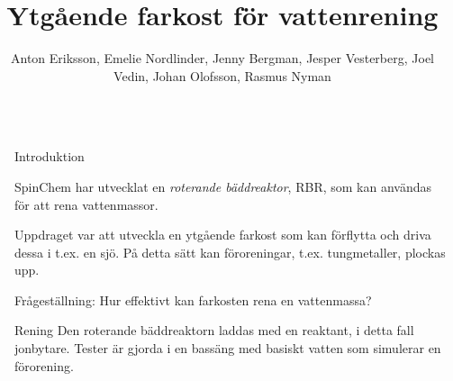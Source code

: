 \documentclass[final]{beamer}
\title{Ytgående farkost för vattenrening}
\author{Anton Eriksson, Emelie Nordlinder, Jenny Bergman,
  Jesper Vesterberg, Joel Vedin, Johan Olofsson, Rasmus Nyman}
\institute{Design-Build-Test Grupp 5, Umeå Universitet}
\newlength{\onecolwid}
\begin{document}

\setlength{\belowcaptionskip}{2ex} %
\setlength\belowdisplayshortskip{2ex} %

\begin{frame}[t]

  \begin{columns}[c]
    \begin{column}{\textwidth}
      \centering
      \vskip 1cm
      \vskip 2cm
    \end{column}
  \end{columns}

  \vspace{2cm}

  \begin{columns}[t, totalwidth=\textwidth]

    \begin{column}{0.001\textwidth}\end{column} %

    \begin{column}{\onecolwid}

      \begin{block}{Introduktion}

        SpinChem har utvecklat en \emph{roterande bäddreaktor}, RBR,
        som kan användas för att rena vattenmassor.

        Uppdraget var att utveckla
        en ytgående farkost som kan förflytta och driva dessa i t.ex. en sjö.
        På detta sätt kan föroreningar, t.ex. tungmetaller, plockas upp.

        Frågeställning: Hur effektivt kan farkosten rena en vattenmassa?

      \end{block}

      \begin{block}{Rening}
        Den roterande bäddreaktorn laddas med en reaktant, i detta fall jonbytare.
        Tester är gjorda i en bassäng med basiskt vatten som simulerar en förorening.


\end{block}
\end{column}
\end{columns}
\end{frame}
\end{document}
